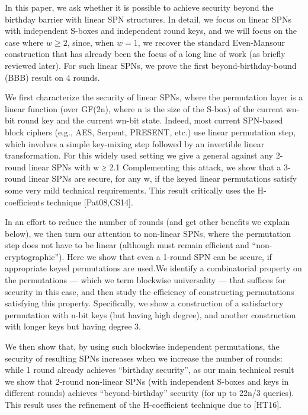 
In this paper, we ask whether it is possible to achieve security beyond the birthday barrier with linear SPN structures. In detail, we focus on linear SPNs with independent S-boxes and independent round keys, and we will focus on the case where $w\geq2$, since, when $w = 1$, we recover the standard Even-Mansour construction that has already been the focus
of a long line of work (as briefly reviewed later). For such linear SPNs, we prove the first beyond-birthday-bound (BBB) result on 4 rounds.





We first characterize the security of linear SPNs, where the
permutation layer is a linear function (over GF(2n), where n is the size of the
S-box) of the current wn-bit round key and the current wn-bit state. Indeed,
most current SPN-based block ciphers (e.g., AES, Serpent, PRESENT, etc.)
use linear permutation step, which involves a simple key-mixing step followed
by an invertible linear transformation. For this widely used setting we give a
general against any 2-round linear SPNs with w ≥ 2.1 Complementing this
attack, we show that a 3-round linear SPNs are secure, for any w, if the keyed
linear permutations satisfy some very mild technical requirements. This result
critically uses the H-coefficients technique [Pat08,CS14].


In an effort to reduce the number of rounds (and get other
benefits we explain below), we then turn our attention to non-linear SPNs, where
the permutation step does not have to be linear (although must remain efficient
and “non-cryptographic”). Here we show that even a 1-round SPN can be secure,
if appropriate keyed permutations are used.We identify a combinatorial property
on the permutations — which we term blockwise universality — that suffices for
security in this case, and then study the efficiency of constructing permutations
satisfying this property. Specifically, we show a construction of a satisfactory
permutation with n-bit keys (but having high degree), and another construction
with longer keys but having degree 3.


We then show that, by using such blockwise independent permutations, the
security of resulting SPNs increases when we increase the number of rounds:
while 1 round already achieves “birthday security”, as our main technical result
we show that 2-round non-linear SPNs (with independent S-boxes and keys in
different rounds) achieves “beyond-birthday” security (for up to 22n/3 queries).
This result uses the refinement of the H-coefficient technique due to [HT16].






